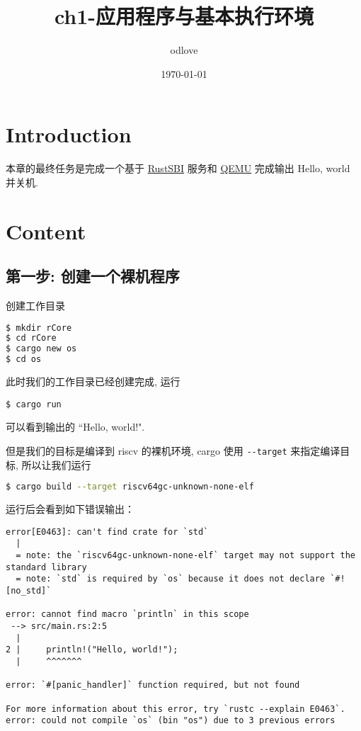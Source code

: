 \documentclass{ctexart}
\begin{document}
\title{ch1-应用程序与基本执行环境}
\author{odlove}
\date{\today}
\maketitle

\section{Introduction}

本章的最终任务是完成一个基于
\href{https://github.com/rustsbi/rustsbi}{RustSBI}
服务和
\href{https://www.qemu.org/}{QEMU}
完成输出 Hello, world 并关机.

\section{Content}

\subsection{第一步: 创建一个裸机程序}

创建工作目录
\begin{lstlisting}[language=bash]
$ mkdir rCore
$ cd rCore
$ cargo new os
$ cd os
\end{lstlisting}

此时我们的工作目录已经创建完成,
运行
\begin{lstlisting}
$ cargo run
\end{lstlisting}
可以看到输出的 ``Hello, world!".

但是我们的目标是编译到 riscv 的裸机环境,
cargo 使用 \verb|--target| 来指定编译目标,
所以让我们运行
\begin{lstlisting}[language=bash]
$ cargo build --target riscv64gc-unknown-none-elf
\end{lstlisting}

运行后会看到如下错误输出：
\begin{lstlisting}
error[E0463]: can't find crate for `std`
  |
  = note: the `riscv64gc-unknown-none-elf` target may not support the standard library
  = note: `std` is required by `os` because it does not declare `#![no_std]`

error: cannot find macro `println` in this scope
 --> src/main.rs:2:5
  |
2 |     println!("Hello, world!");
  |     ^^^^^^^

error: `#[panic_handler]` function required, but not found

For more information about this error, try `rustc --explain E0463`.
error: could not compile `os` (bin "os") due to 3 previous errors
\end{lstlisting}
\end{document}
